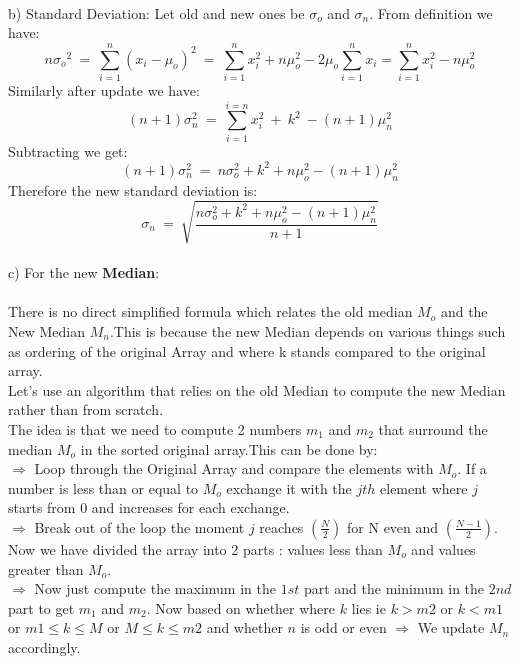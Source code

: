 \documentclass[12pt]{article}
\begin{document}
\\
b) Standard Deviation: Let old and new ones be $\sigma_o$ and $\sigma_n$.
From definition we have:
\begin{equation*}
    n{\sigma_o}^2\ =\ \sum_{i=1}^{n}(x_i-\mu_o)^2\ =\ \sum_{i=1}^{n}x_i^2+n\mu_o^2-2\mu_o\sum_{i=1}^{n}x_i = \sum_{i=1}^{n}x_i^2 - n\mu_o^2
\end{equation*}
Similarly after update we have:
\begin{equation*}
    (n+1)\sigma_n^2\ =\ \sum_{i=1}^{i=n}x_i^2\ +\ k^2\ -(n+1)\mu_n^2
\end{equation*}
Subtracting we get:
\begin{equation*}
    (n+1)\sigma_n^2\ =\ n\sigma_o^2 + k^2 + n\mu_o^2 - (n+1)\mu_n^2
\end{equation*}
Therefore the new standard deviation is:
\begin{equation}
    \sigma_n\ =\ \sqrt{\frac{n\sigma_o^2 + k^2 + n\mu_o^2 - (n+1)\mu_n^2}{n+1}}
\end{equation}
\\
c) For the new \textbf{Median}: \\ \\
There is no direct simplified formula which relates the old median $M_o$ and the New Median $M_n$.This is because the new Median depends on various things such as ordering of the original Array and where k stands compared to the original array.\\
Let's use an algorithm that relies on the old Median to compute the new Median rather than from scratch.\\
The idea is that we need to compute 2 numbers $m_1$ and $m_2$ that surround the median $M_o$ in the sorted original array.This can be done by:\\
$\Rightarrow$ Loop through the Original Array and compare the elements with $M_o$. If a number is less than or equal to $M_o$ exchange it with the $jth$ element where $j$ starts from 0 and increases for each exchange.\\
$\Rightarrow$ Break out of the loop the moment $j$ reaches $(\frac{N}{2})$ for N even and $(\frac{N-1}{2})$. Now we have divided the array into 2 parts : values less than $M_o$ and values greater than $M_o$.\\
$\Rightarrow$ Now just compute the maximum in the $1st$ part and the minimum in the $2nd$ part to get $m_1$ and $m_2$.
\newline
Now based on whether where $k$ lies ie $k>m2$ or $k<m1$ or $m1 \leq k \leq M$ or $M \leq k \leq m2$ and whether $n$ is odd or even $\Rightarrow$ We update $M_n$ accordingly.
\end{document}
